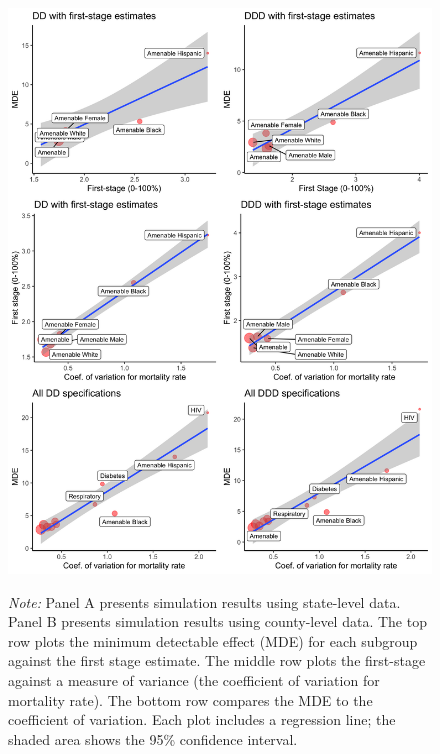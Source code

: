 \documentclass[12pt]{article}%
\begin{document}
\begin{landscape}
\begin{figure}[ht]
\begin{minipage}{0.95\linewidth}
\begin{minipage}[b]{0.45\linewidth}
  \includegraphics[width=\textwidth]{../output/figures/mde_by_subgroup_county.png}
  \end{minipage}
  \begin{justify}
                {\footnotesize
                    \emph{Note:} 
                Panel A presents simulation results using state-level data. 
                Panel B presents simulation results using county-level data. 
                The top row plots the minimum detectable effect (MDE) for each subgroup against the first stage estimate. 
                The middle row plots the first-stage against a measure of variance (the coefficient of variation for mortality rate). 
                The bottom row compares the MDE to the coefficient of variation. 
                Each plot includes a regression line; the shaded area shows the 95\% confidence interval.  
                \par}
            \end{justify}
  \end{minipage}
  \label{fig:mde_by_subgroup}
\end{figure}
\end{landscape}
\end{document}
